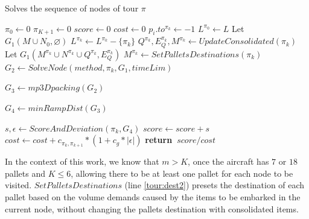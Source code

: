 \documentclass[preprint,authoryear]{elsarticle}
\renewcommand{\Return}{\State \bf {return}~}
\begin{document}
\begin{algorithm}[H]
	\caption{ Solves the sequence of nodes of tour $\pi$ }  \label{alg:tour}
	
	\begin{algorithmic}[1]
		
		
		\State $\pi_0 \gets 0$ \label{tour:pi1}
		\State $\pi_{K+1} \gets 0$ \label{tour:pi2}
		\State $score \gets 0$ \label{tour:score}
		\State $cost \gets 0$ \label{tour:cost}
		 \label{tour:loop1}		
				\State $p_i.to^{\pi_k} \gets -1$ \label{tour:-1} 
			\EndFor	
				\State $L^{\pi_0} \gets L$
				\State Let $G_1(M \cup N_0, \varnothing)$ \label{tour:g11}
			\Else
				\State $L^{\pi_k} \gets L^{\pi_k} - \{\pi_k\}$  \label{tour:lk1}			
				\State $Q^{\pi_k}, E_Q^{\pi_k}, M^{\pi_k} \gets UpdateConsolidated(\pi_k)$ \label{tour:dest}			
				\State Let $G_1(M^{\pi_k} \cup N^{\pi_k} \cup Q^{\pi_k}, E_Q^{\pi_k})$ \label{tour:g12}
			\EndIf  \label{tour:lk2}	
			\State $M^{\pi_k} \gets SetPalletsDestinations( \pi_k )$ \label{tour:dest2}		
			\State $G_2 \gets SolveNode(method, \pi_k, G_1, timeLim)$ \label{tour:node}

{\color{purple} \State	$G_3 \gets mp3Dpacking(G_2)$  \label{tour:3dpacking} }	
		
{\color{blue}   \State	$G_4 \gets minRampDist(G_3)$  \label{tour:minRampDist} }
			
			\State $s, \epsilon \gets ScoreAndDeviation(\pi_k, G_4)$ \label{tour:analyse}
			\State $score \gets score + s$ \label{tour:score2}
			\State $cost \gets cost + c_{\pi_k, \pi_{k+1}} * (1 + c_g * |\epsilon|)$ \label{tour:cost2} 
		\EndFor  \label{tour:loop2}
		\Return $score / cost$ \label{tour:f}
		
		\EndProcedure
		
	\end{algorithmic}
\end{algorithm}


In the context of this work, we know that $m>K$, once the aircraft has $7$\/ or $18$\/ pallets and $K\leq 6$, allowing there to be at least one pallet for each node to be visited. $SetPalletsDestinations$\/ (line \ref{tour:dest2}) presets the destination of each pallet based on the volume demands caused by the items to be embarked in the current node, without changing the pallets destination with consolidated items.
\end{document}

